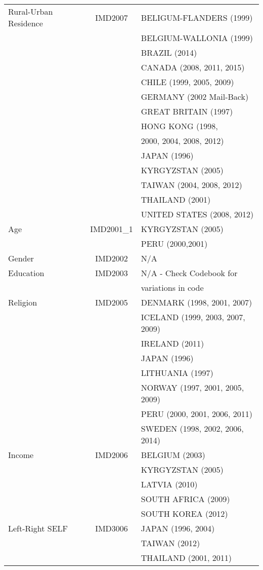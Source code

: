 \documentclass[12pt, titlepage]{article}
\begin{document}
\begin{center}
\begin{longtable}{lcl}
		Rural-Urban Residence&IMD2007&BELIGUM-FLANDERS (1999) \\
		&&BELGIUM-WALLONIA (1999)\\
		&&BRAZIL (2014)\\
		&&CANADA (2008, 2011, 2015)\\
		&&CHILE (1999, 2005, 2009)\\
		&&GERMANY (2002 Mail-Back)\\
		&&GREAT BRITAIN (1997)\\
		&&HONG KONG (1998,\\
		&& 2000, 2004, 2008, 2012)\\
		&&JAPAN (1996)\\
		&&KYRGYZSTAN (2005)\\
		&&TAIWAN (2004, 2008, 2012)\\
		&&THAILAND (2001)\\
		&&UNITED STATES (2008, 2012)\\
	\hline
		Age&IMD2001\_1&KYRGYZSTAN (2005)\\
		&&PERU (2000,2001)\\
	\hline
	Gender&IMD2002&N/A\\
	\hline
	Education&IMD2003&N/A - Check Codebook for \\
	&& variations in code\\
	\hline
	Religion&IMD2005&DENMARK (1998, 2001, 2007)\\
	&&ICELAND (1999, 2003, 2007, 2009)\\
	&&IRELAND (2011)\\
	&&JAPAN (1996)\\
	&&LITHUANIA (1997)\\
	&&NORWAY (1997, 2001, 2005, 2009)\\
	&&PERU (2000, 2001, 2006, 2011)\\
	&&SWEDEN (1998, 2002, 2006, 2014)\\
	\hline
	Income&IMD2006&BELGIUM (2003)\\
	&& KYRGYZSTAN (2005)\\
	&&LATVIA (2010)\\
	&&SOUTH AFRICA (2009)\\ 
	&&SOUTH KOREA (2012)\\
	\hline
	Left-Right SELF&IMD3006&JAPAN (1996, 2004)\\ 
	&&TAIWAN (2012)\\
	&&THAILAND (2001, 2011)\\
	\hline
\end{longtable}
\end{center}
\end{document}
